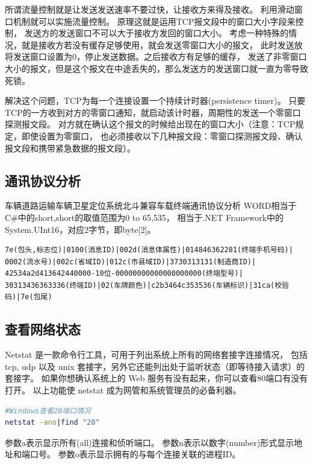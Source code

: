 \documentclass{book}
\begin{document}
所谓流量控制就是让发送发送速率不要过快，让接收方来得及接收。
利用滑动窗口机制就可以实施流量控制。
原理这就是运用TCP报文段中的窗口大小字段来控制，
发送方的发送窗口不可以大于接收方发回的窗口大小。
考虑一种特殊的情况，就是接收方若没有缓存足够使用，就会发送零窗口大小的报文，
此时发送放将发送窗口设置为0，停止发送数据。之后接收方有足够的缓存，
发送了非零窗口大小的报文，但是这个报文在中途丢失的，那么发送方的发送窗口就一直为零导致死锁。

解决这个问题，TCP为每一个连接设置一个持续计时器(persistence timer)。
只要TCP的一方收到对方的零窗口通知，就启动该计时器，周期性的发送一个零窗口探测报文段。
对方就在确认这个报文的时候给出现在的窗口大小（注意：TCP规定，即使设置为零窗口，
也必须接收以下几种报文段：零窗口探测报文段、确认报文段和携带紧急数据的报文段）。

\subsection{通讯协议分析}

车辆道路运输车辆卫星定位系统北斗兼容车载终端通讯协议分析
WORD相当于C\#中的short,short的取值范围为0 to 65,535，
相当于.NET Framework中的System.UInt16，对应2字节，即byte[2]。

\begin{lstlisting}
7e(包头,标志位)|0100(消息ID)|002d(消息体属性)|014846362281(终端手机号码)|
0002(流水号)|002c(省域ID)|012c(市县域ID)|3730313131(制造商ID)|
42534a2d413642440000-10位-00000000000000000000(终端型号)|
30313436363336(终端ID)|02(车牌颜色)|c2b3464c353536(车辆标识)|31ca(校验码)|7e(包尾)
\end{lstlisting}

\subsection{查看网络状态}

Netstat 是一款命令行工具，可用于列出系统上所有的网络套接字连接情况，
包括 tcp, udp 以及 unix 套接字，另外它还能列出处于监听状态（即等待接入请求）的套接字。
如果你想确认系统上的 Web 服务有没有起来，你可以查看80端口有没有打开。
以上功能使 netstat 成为网管和系统管理员的必备利器。

\begin{lstlisting}[language=Bash]
#Windows查看20端口情况
netstat -ano|find "20"
\end{lstlisting}

参数a表示显示所有(all)连接和侦听端口。
参数n表示以数字(number)形式显示地址和端口号。
参数o表示显示拥有的与每个连接关联的进程ID。
\end{document}
